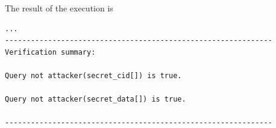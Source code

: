 


The result of the execution is

\begin{lstlisting}[caption={ProVerif verification output for the crowdsensing protocol model.},label={lst:appendix-b-proverif-model-results}]
...
--------------------------------------------------------------
Verification summary:

Query not attacker(secret_cid[]) is true.

Query not attacker(secret_data[]) is true.

--------------------------------------------------------------
\end{lstlisting}
